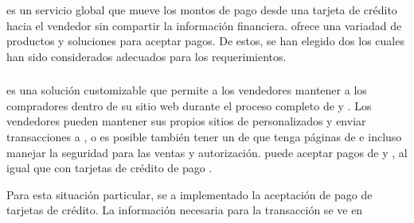 \paypalNAME es un servicio global que mueve los montos de pago desde una tarjeta de crédito hacia el vendedor sin compartir la información financiera. \paypalNAME ofrece una variadad de productos y soluciones para aceptar pagos. De estos, se han elegido dos los cuales han sido considerados adecuados para los requerimientos.

\subsubsection{\PPPaymentProNAME}
\PPPaymentProNAME es una solución customizable que permite a los vendedores mantener a los compradores dentro de su sitio web durante el proceso completo de \paymentsCOM y \checkoutCOM. Los vendedores pueden mantener sus propios sitios de \checkoutCOM personalizados y enviar transacciones a \paypalNAME, o es posible también tener un \hostCPT de \paypalNAME que tenga páginas de \checkoutCOM e incluso manejar la seguridad para las ventas y autorización. \PPPaymentProNAME puede aceptar pagos de \paypalNAME y  \paypalCreditNAME, al igual que con tarjetas de crédito de pago \cite{online_paypal_developer_acceptpayments}.

Para esta situación particular, se a implementado la aceptación de pago de tarjetas de crédito. La información necesaria para la transacción se ve en 



